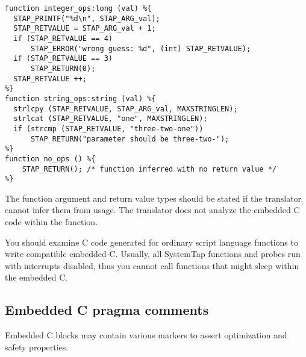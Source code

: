 \documentclass[twoside,english]{article}
\newenvironment{vindent}
{\begin{list}{}{\setlength{\listparindent}{6pt}}
\item[]}
{\end{list}}
\begin{document}
\begin{vindent}
\begin{verbatim}
function integer_ops:long (val) %{
  STAP_PRINTF("%d\n", STAP_ARG_val);
  STAP_RETVALUE = STAP_ARG_val + 1;
  if (STAP_RETVALUE == 4)
      STAP_ERROR("wrong guess: %d", (int) STAP_RETVALUE);
  if (STAP_RETVALUE == 3)
      STAP_RETURN(0);
  STAP_RETVALUE ++;
%}
function string_ops:string (val) %{
  strlcpy (STAP_RETVALUE, STAP_ARG_val, MAXSTRINGLEN);
  strlcat (STAP_RETVALUE, "one", MAXSTRINGLEN);
  if (strcmp (STAP_RETVALUE, "three-two-one"))
      STAP_RETURN("parameter should be three-two-");
%}
function no_ops () %{
    STAP_RETURN(); /* function inferred with no return value */
%}
\end{verbatim}
\end{vindent}

The function argument and return value types should be stated if the
translator cannot infer them from usage.  The translator does not
analyze the embedded C code within the function.

You should examine C code generated for ordinary script language
functions to write compatible embedded-C.  Usually, all SystemTap
functions and probes run with interrupts disabled, thus you cannot
call functions that might sleep within the embedded C.

\subsection{Embedded C pragma comments}

Embedded C blocks may contain various markers to assert optimization
and safety properties.
\end{document}
